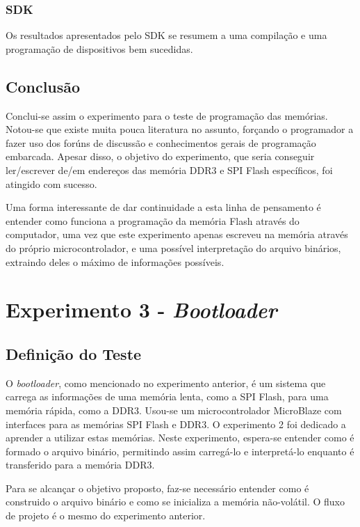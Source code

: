 \documentclass[11pt,a4paper,oneside]{book}
\begin{document}
\subsection{SDK}
Os resultados apresentados pelo SDK se resumem a uma compilação e uma programação de dispositivos bem sucedidas.

\section{Conclusão}
Conclui-se assim o experimento para o teste de programação das memórias.
Notou-se que existe muita pouca literatura no assunto, forçando o programador a fazer uso dos forúns de discussão e conhecimentos gerais de programação embarcada.
Apesar disso, o objetivo do experimento, que seria conseguir ler/escrever de/em endereços das memória DDR3 e SPI Flash específicos, foi atingido com sucesso.

Uma forma interessante de dar continuidade a esta linha de pensamento é entender como funciona a programação da memória Flash através do computador, uma vez que este experimento apenas escreveu na memória através do próprio microcontrolador, e uma possível interpretação do arquivo binários, extraindo deles o máximo de informações possíveis.


\chapter{Experimento 3 - \textit{Bootloader}}
\section{Definição do Teste}
O \textit{bootloader}, como mencionado no experimento anterior, é um sistema que carrega as informações de uma memória lenta, como a SPI Flash, para uma memória rápida, como a DDR3.
Usou-se um microcontrolador MicroBlaze com interfaces para as memórias SPI Flash e DDR3.
O experimento 2 foi dedicado a aprender a utilizar estas memórias.
Neste experimento, espera-se entender como é formado o arquivo binário, permitindo assim carregá-lo e interpretá-lo enquanto é transferido para a memória DDR3.

Para se alcançar o objetivo proposto, faz-se necessário entender como é construido o arquivo binário e como se inicializa a memória não-volátil.
O fluxo de projeto é o mesmo do experimento anterior.
\end{document}
